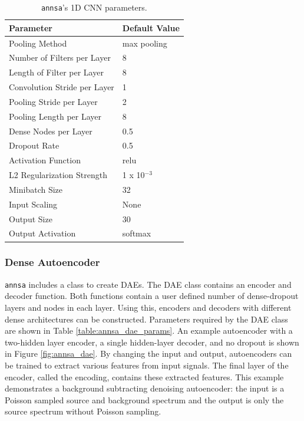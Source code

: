 \begin{table}[H]
\centering
\caption{\texttt{annsa}'s 1D CNN parameters.}
\begin{tabular}{ll}
\hline
\textbf{Parameter} & \textbf{Default Value}\\ \hline
Pooling Method & max pooling \\
Number of Filters per Layer & 8 \\
Length of Filter per Layer & 8 \\
Convolution Stride per Layer & 1 \\
Pooling Stride per Layer & 2 \\
Pooling Length per Layer & 8 \\
Dense Nodes per Layer & 0.5 \\
Dropout Rate & 0.5 \\
Activation Function & relu \\
L2 Regularization Strength & 1 x 10$^{-3}$\\ 
Minibatch Size & 32 \\ 
Input Scaling & None \\
Output Size & 30 \\
Output Activation & softmax\\ \hline
\end{tabular}
\label{table:annsa_cnn_params}
\end{table}

\subsubsection{Dense Autoencoder}

\verb|annsa| includes a class to create DAEs. The DAE class contains an encoder and decoder function. Both functions contain a user defined number of dense-dropout layers and nodes in each layer. Using this, encoders and decoders with different dense architectures can be constructed. Parameters required by the DAE class are shown in Table \ref{table:annsa_dae_params}. An example autoencoder with a two-hidden layer encoder, a single hidden-layer decoder, and no dropout is shown in Figure \ref{fig:annsa_dae}. By changing the input and output, autoencoders can be trained to extract various features from input signals. The final layer of the encoder, called the encoding, contains these extracted features. This example demonstrates a background subtracting denoising autoencoder: the input is a Poisson sampled source and background spectrum and the output is only the source spectrum without Poisson sampling.

